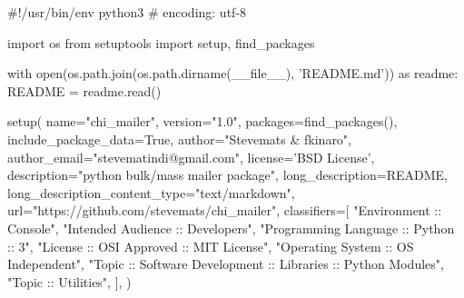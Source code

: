 #!/usr/bin/env python3
# encoding: utf-8

import os
from setuptools import setup, find_packages

with open(os.path.join(os.path.dirname(__file__), 'README.md')) as readme:
    README = readme.read()

setup(
    name="chi_mailer",
    version="1.0",
    packages=find_packages(),
    include_package_data=True,
    author="Stevemats & fkinaro",
    author_email="stevematindi@gmail.com",
    license='BSD License',
    description="python bulk/mass mailer package",
    long_description=README,
    long_description_content_type="text/markdown",
    url="https://github.com/stevemats/chi_mailer",
    classifiers=[
        "Environment :: Console",
        "Intended Audience :: Developers",
        "Programming Language :: Python :: 3",
        "License :: OSI Approved :: MIT License",
        "Operating System :: OS Independent",
        "Topic :: Software Development :: Libraries :: Python Modules",
        "Topic :: Utilities",
    ],
)
